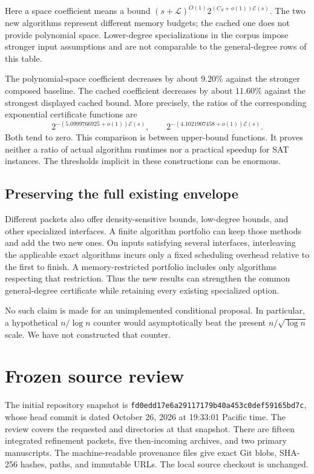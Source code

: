 \documentclass[11pt,letterpaper]{article}
\theoremstyle{remark}\newtheorem{remark}[theorem]{Remark}
\newcommand{\E}{\mathcal E}
\newcommand{\pin}{\texttt{fd0edd17e6a29117179b40a453c0def59165bd7c}}
\begin{document}
Here a space coefficient means a bound
$(s+\mathcal L)^{O(1)}2^{(C_S+o(1))\E(s)}$. The two new algorithms
represent different memory budgets; the cached one does not provide
polynomial space. Lower-degree specializations in the corpus impose
stronger input assumptions and are not comparable to the general-degree
rows of this table.

The polynomial-space coefficient decreases by about $9.20\%$ against the
stronger composed baseline. The cached coefficient decreases by about
$11.60\%$ against the strongest displayed cached bound. More precisely,
the ratios of the corresponding exponential certificate functions are
\[
 2^{-(5.0999766925+o(1))\E(s)},\qquad
 2^{-(4.1021907458+o(1))\E(s)}.
\]
Both tend to zero. This comparison is between upper-bound functions.
It proves neither a ratio of actual algorithm runtimes nor a practical
speedup for SAT instances. The thresholds implicit in these constructions
can be enormous.

\subsection{Preserving the full existing envelope}
Different packets also offer density-sensitive bounds, low-degree bounds,
and other specialized interfaces. A finite algorithm portfolio can keep
those methods and add the two new ones. On inputs satisfying several
interfaces, interleaving the applicable exact algorithms incurs only a
fixed scheduling overhead relative to the first to finish. A memory-restricted
portfolio includes only algorithms respecting that restriction. Thus the
new results can strengthen the common general-degree certificate while
retaining every existing specialized option.

No such claim is made for an unimplemented conditional proposal. In
particular, a hypothetical $n/\log n$ counter would asymptotically beat
the present $n/\sqrt{\log n}$ scale. We have not constructed that counter.

\section{Frozen source review}
\label{sec:review}

The initial repository snapshot is \pin, whose head commit is dated
October 26, 2026 at 19:33:01 Pacific time. The review covers the requested
 and 
directories at that snapshot. There are fifteen integrated refinement
packets, five then-incoming archives, and two primary manuscripts.
The machine-readable provenance files give exact Git blobs, SHA-256
hashes, paths, and immutable URLs. The local source checkout is unchanged.
\end{document}

